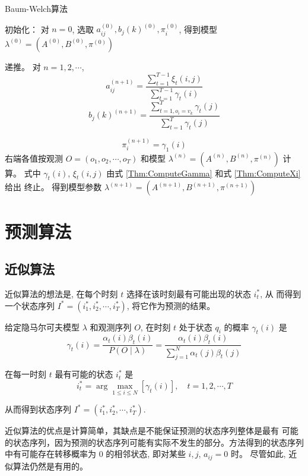 \begin{algorithm}[htbp]
    \caption{Baum-Welch算法}


    初始化：
对 $ n=0 $, 选取 $ a_{i j}^{(0)}, b_{j}(k)^{(0)}, \pi_{i}^{(0)} $, 得到模型 $ \lambda^{(0)}=\left(A^{(0)}, B^{(0)}, \pi^{(0)}\right) $\;

递推。 对 $ n=1,2, \cdots $,
$$
a_{i j}^{(n+1)}=\frac{\sum_{t=1}^{T-1} \xi_{t}(i, j)}{\sum_{t=1}^{T-1} \gamma_{t}(i)}
$$
$$ b_{j}(k)^{(n+1)}=\frac{\sum_{t=1, o_{i}=v_{k}}^{T} \gamma_{t}(j)}{\sum_{t=1}^{T} \gamma_{t}(j)} $$

$$ \pi_{i}^{(n+1)}=\gamma_{1}(i) $$
右端各值按观测 $ O=\left(o_{1}, o_{2}, \cdots, o_{T}\right) $ 和模型 $ \lambda^{(n)}=\left(A^{(n)}, B^{(n)}, \pi^{(n)}\right) $ 计算。 式中 $ \gamma_{t}(i) $, $ \xi_{t}(i, j) $ 由式 \ref{Thm:ComputeGamma} 和式 \ref{Thm:ComputeXi}  给出\;
终止。 得到模型参数 $ \lambda^{(n+1)}=\left(A^{(n+1)}, B^{(n+1)}, \pi^{(n+1)}\right) $
\end{algorithm}

\section{预测算法}

\subsection{近似算法}

近似算法的想法是, 在每个时刻 $ t $ 选择在该时刻最有可能出现的状态 $ i_{t}^{*} $, 从 而得到一个状态序列 $ I^{*}=\left(i_{1}^{*}, i_{2}^{*}, \cdots, i_{T}^{*}\right) $, 将它作为预测的结果。

给定隐马尔可夫模型 $ \lambda $ 和观测序列 $ O $, 在时刻 $ t $ 处于状态 $ q_{i} $ 的概率 $ \gamma_{t}(i) $ 是
$$
\gamma_{t}(i)=\frac{\alpha_{t}(i) \beta_{t}(i)}{P(O \mid \lambda)}=\frac{\alpha_{t}(i) \beta_{t}(i)}{\sum_{j=1}^{N} \alpha_{t}(j) \beta_{t}(j)}
$$

在每一时刻 $ t $ 最有可能的状态 $ i_{t}^{*} $ 是
$$
i_{t}^{*}=\arg \max _{1 \leqslant i \leqslant N}\left[\gamma_{t}(i)\right], \quad t=1,2, \cdots, T
$$

从而得到状态序列 $ I^{*}=\left(i_{1}^{*}, i_{2}^{*}, \cdots, i_{T}^{*}\right) $.

\begin{remark}
   近似算法的优点是计算简单，其缺点是不能保证预测的状态序列整体是最有
可能的状态序列，因为预测的状态序列可能有实际不发生的部分。方法得到的状态序列中有可能存在转移概率为 0 的相邻状态, 即对某些 $ i, j $, $ a_{i j}=0 $ 时。 尽管如此, 近似算法仍然是有用的。 
\end{remark}

